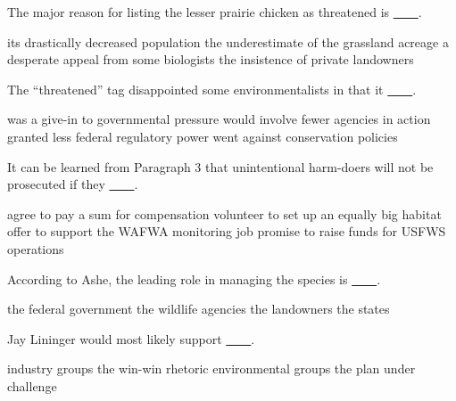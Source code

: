 \item The major reason for listing the lesser prairie chicken as threatened is \uline{~~~~}.
\begin{tasks}
	\task its drastically decreased population
	\task the underestimate of the grassland acreage
	\task a desperate appeal from some biologists
	\task the insistence of private landowners
\end{tasks}
\item The ``threatened'' tag disappointed some environmentalists in that it \uline{~~~~}.
\begin{tasks}
	\task was a give-in to governmental pressure
	\task would involve fewer agencies in action
	\task granted less federal regulatory power
	\task went against conservation policies
\end{tasks}
\item It can be learned from Paragraph 3 that unintentional harm-doers will not be prosecuted if they \uline{~~~~}.
\begin{tasks}
	\task agree to pay a sum for compensation
	\task volunteer to set up an equally big habitat
	\task offer to support the WAFWA monitoring job
	\task promise to raise funds for USFWS operations
\end{tasks}
\item According to Ashe, the leading role in managing the species is \uline{~~~~}.
\begin{tasks}
	\task the federal government
	\task the wildlife agencies
	\task the landowners
	\task the states
\end{tasks}
\item Jay Lininger would most likely support \uline{~~~~}.
\begin{tasks}
	\task industry groups
	\task the win-win rhetoric
	\task environmental groups
	\task the plan under challenge
\end{tasks}